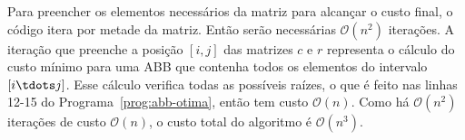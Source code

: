 Para preencher os elementos necessários da matriz para alcançar o custo final, o código itera por metade da matriz. Então serão necessárias \( \mathcal{O}(n^2) \) iterações. A iteração que preenche a posição $[i,j]$ das matrizes $c$ e $r$ representa o cálculo do custo mínimo para uma ABB que contenha todos os elementos do intervalo $[i \tdots j]$. Esse cálculo verifica todas as possíveis raízes, o que é feito nas linhas 12-15 do Programa~\ref{prog:abb-otima}, então tem custo \( \mathcal{O}(n) \). Como há \( \mathcal{O}(n^2) \) iterações de custo \( \mathcal{O}(n) \), o custo total do algoritmo é \( \mathcal{O}(n^3) \). 



